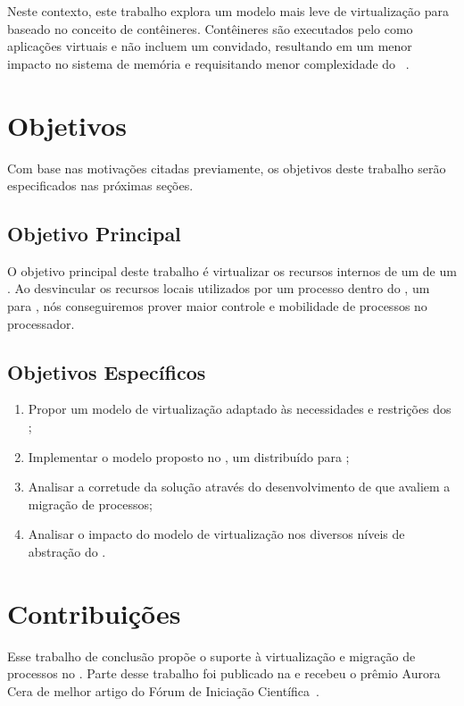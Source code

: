 Neste contexto, este trabalho explora um modelo mais leve de virtualização para \lws baseado no conceito de contêineres. Contêineres são executados pelo \os como aplicações virtuais e não incluem um \os convidado, resultando em um menor impacto no sistema de memória e requisitando menor complexidade do \hardware~\cite{thalheim2018cntr, sharma2016containers}.

\section{Objetivos}
\label{sec.goals}

Com base nas motivações citadas previamente, os objetivos deste trabalho serão especificados nas próximas seções.

\subsection{Objetivo Principal}
\label{sec.goals.primary}

O objetivo principal deste trabalho é virtualizar os recursos internos de um \cluster de um \lw. Ao desvincular os recursos locais utilizados por um processo dentro do \nanvix, um \os para \lws, nós conseguiremos prover maior controle e mobilidade de processos no processador.

\subsection{Objetivos Específicos}
\label{sec.goals.secondary}

\begin{enumerate}[label= (\roman*)]
    \item Propor um modelo de virtualização adaptado às necessidades e restrições dos \lws;
    \item Implementar o modelo proposto no \nanvix, um \so distribuído para \lws;
    \item Analisar a corretude da solução através do desenvolvimento de \benchmarks que avaliem a migração de processos;
    \item Analisar o impacto do modelo de virtualização nos diversos níveis de abstração do \nanvix.
\end{enumerate}

\section{Contribuições}
Esse trabalho de conclusão propõe o suporte à virtualização e migração de processos no \nanvix. Parte desse trabalho foi publicado na \erad e recebeu o prêmio Aurora Cera de melhor artigo do Fórum de Iniciação Científica~\cite{vanz2022virtualizaccao}.

